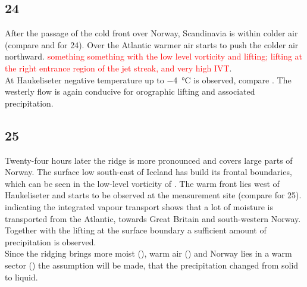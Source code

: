 \subsection*{\SI{24}{\dec}}
\noindent After the passage of the cold front over Norway, Scandinavia is within colder air (compare  and  for \SI{24}{\dec}). Over the Atlantic warmer air starts to push the colder air northward. \textcolor{red}{something something with the low level vorticity and lifting; lifting at the right entrance region of the jet streak, and very high IVT}.
\\
At Haukeliseter negative temperature up to \SI{-4}{\celsius} is observed, compare . The westerly flow is again conducive for orographic lifting and associated precipitation.

\subsection*{\SI{25}{\dec}}
\noindent Twenty-four hours later the ridge is more pronounced and covers large parts of Norway. The surface low south-east of Iceland has build its frontal boundaries, which can be seen in the low-level vorticity of . The warm front lies west of Haukeliseter and starts to be observed at the measurement site (compare  for \SI{25}{\dec}).  indicating the integrated vapour transport shows that a lot of moisture is transported from the Atlantic, towards Great Britain and south-western Norway. Together with the lifting at the surface boundary a sufficient amount of precipitation is observed. 
\\
Since the ridging brings more moist (), warm air () and Norway lies in a warm sector () the assumption will be made, that the precipitation changed from solid to liquid. 

